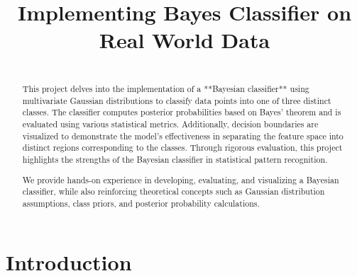 \documentclass[conference]{IEEEtran}
\begin{document}
	\title{Implementing Bayes Classifier on Real World Data
	}
	
	\author{
		\and
		\and
	}
	
	\maketitle
	
	\begin{abstract}
		\\
		This project delves into the implementation of a **Bayesian classifier** using multivariate Gaussian distributions to classify data points into one of three distinct classes. The classifier computes posterior probabilities based on Bayes' theorem and is evaluated using various statistical metrics. Additionally, decision boundaries are visualized to demonstrate the model's effectiveness in separating the feature space into distinct regions corresponding to the classes. Through rigorous evaluation, this project highlights the strengths of the Bayesian classifier in statistical pattern recognition.
		
		We provide hands-on experience in developing, evaluating, and visualizing a Bayesian classifier, while also reinforcing theoretical concepts such as Gaussian distribution assumptions, class priors, and posterior probability calculations.
	\end{abstract}
	
	\section{Introduction}
	
\end{document}
